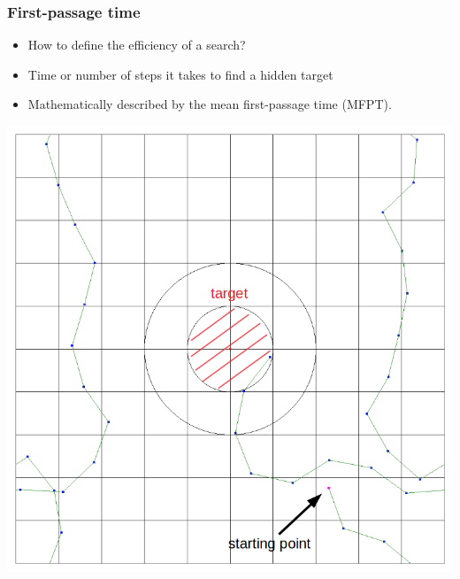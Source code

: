 \documentclass[11pt]{beamer}
\begin{document}
\begin{frame}
 \frametitle{First-passage time}
 
 \begin{minipage}[h]{0.49\textwidth}
  \begin{itemize}
  \item How to define the efficiency of a search?
  \item Time or number of steps it takes to find a hidden target
  \item Mathematically described by the mean first-passage time (MFPT).
 \end{itemize}
 \end{minipage}
 \begin{minipage}[h]{0.49\textwidth}
  \includegraphics[width=\textwidth]{gfx/trajectory.png}
 \end{minipage}

\end{frame}
\end{document}
